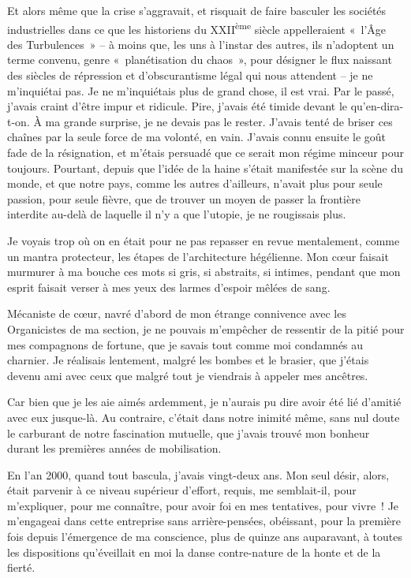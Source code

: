 \documentclass[
  extrafontsizes,
  oneside,
  14pt
]{memoir}
\begin{document}
Et alors même que la crise s'aggravait, et risquait de faire basculer les
sociétés industrielles dans ce que les historiens du XXII\textsuperscript{ème}
siècle appelleraient «~l'Âge des Turbulences~» -- à moins que, les uns à
l'instar des autres, ils n'adoptent un terme convenu, genre «~planétisation du
chaos~», pour désigner le flux naissant des siècles de répression et
d'obscurantisme légal qui nous attendent -- je ne m'inquiétai pas. Je ne
m'inquiétais plus de grand chose, il est vrai. Par le passé, j'avais craint
d'être impur et ridicule. Pire, j'avais été timide devant le qu'en-dira-t-on. À
ma grande surprise, je ne devais pas le rester. J'avais tenté de briser ces
chaînes par la seule force de ma volonté, en vain. J'avais connu ensuite le
goût fade de la résignation, et m'étais persuadé que ce serait mon régime
minceur pour toujours. Pourtant, depuis que l'idée de la haine s'était
manifestée sur la scène du monde, et que notre pays, comme les autres
d'ailleurs, n'avait plus pour seule passion, pour seule fièvre, que de trouver
un moyen de passer la frontière interdite au-delà de laquelle il n'y a que
l'utopie, je ne rougissais plus.

Je voyais trop où on en était pour ne pas repasser en revue mentalement, comme
un mantra protecteur, les étapes de l'architecture hégélienne. Mon cœur faisait
murmurer à ma bouche ces mots si gris, si abstraits, si intimes, pendant que
mon esprit faisait verser à mes yeux des larmes d'espoir mêlées de sang.

Mécaniste de cœur, navré d'abord de mon étrange connivence avec les
Organicistes de ma section, je ne pouvais m'empêcher de ressentir de la pitié
pour mes compagnons de fortune, que je savais tout comme moi condamnés au
charnier. Je réalisais lentement, malgré les bombes et le brasier, que j'étais
devenu ami avec ceux que malgré tout je viendrais à appeler mes ancêtres.

Car bien que je les aie aimés ardemment, je n'aurais pu dire avoir été lié
d'amitié avec eux jusque-là. Au contraire, c'était dans notre inimité même,
sans nul doute le carburant de notre fascination mutuelle, que j'avais trouvé
mon bonheur durant les premières années de mobilisation.

En l'an 2000, quand tout bascula, j'avais vingt-deux ans. Mon seul désir,
alors, était parvenir à ce niveau supérieur d'effort, requis, me semblait-il,
pour m'expliquer, pour me connaître, pour avoir foi en mes tentatives, pour
vivre~! Je m'engageai dans cette entreprise sans arrière-pensées, obéissant,
pour la première fois depuis l'émergence de ma conscience, plus de quinze ans
auparavant, à toutes les dispositions qu'éveillait en moi la danse
contre-nature de la honte et de la fierté.
\end{document}

